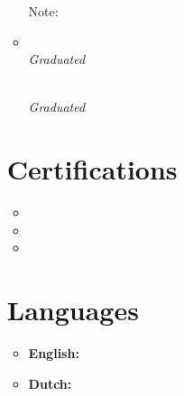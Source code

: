 \documentclass[11pt,a4paper]{article}
\begin{document}
\begin{itemize}[leftmargin=0pt,label={},itemsep=2em,topsep=0pt]
\begin{itemize}[leftmargin=0pt,label={},itemsep=2em]
{\color{secondary}Note:} \textit{\MastersNotableAchievement}


\item \parbox{\textwidth}{\textbf{\BatchelorsUniversity} \hfill \textit{\BatchelorsLocation}}\\
\textit{\BatchelorsCourse} \hfill \textit{Graduated \BatchelorsGraduation}
\parbox{\textwidth}{\textbf{\HEAOHogeschool} \hfill \textit{\HEAOsLocation}}\\
\textit{\HEAOCourse} \hfill \textit{Graduated \BatchelorsGraduation}
\end{itemize}



\vspace{0.5cm}
\section{Certifications}
\begin{itemize}[leftmargin=*,topsep=-6pt,parsep=0pt,partopsep=0pt,itemsep=0pt]
\item \CertHarvardXIntro
\item \CertMicrosoft
\item \CertDutch
\end{itemize}


\vspace{0.5cm}
\section{Languages}
\begin{itemize}[leftmargin=*]
\item \textbf{English:} \LangEnglish
\item \textbf{Dutch:} \LangDutch
\end{itemize} 

\end{itemize}
\end{document}
